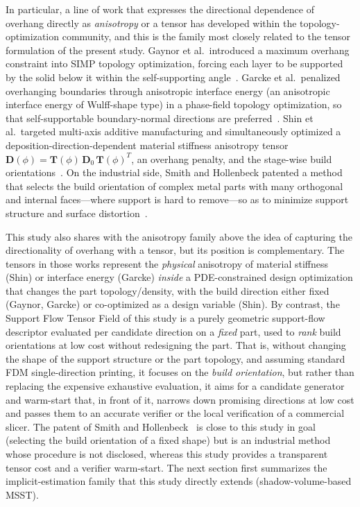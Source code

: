 \documentclass[11pt,a4paper]{article}
\begin{document}
In particular, a line of work that expresses the directional dependence of overhang directly as \emph{anisotropy} or a tensor
has developed within the topology-optimization community, and this is the family most closely related to the tensor formulation of the present study.
Gaynor et al.\ introduced a maximum overhang constraint into SIMP topology optimization, forcing each layer to be supported by the solid below it
within the self-supporting angle~\cite{gaynor2014}.
Garcke et al.\ penalized overhanging boundaries through anisotropic interface energy (an anisotropic interface energy of Wulff-shape type)
in a phase-field topology optimization, so that self-supportable boundary-normal directions are preferred~\cite{garcke2023}.
Shin et al.\ targeted multi-axis additive manufacturing and simultaneously optimized a deposition-direction-dependent material stiffness anisotropy tensor
$\mathbf{D}(\phi)=\mathbf{T}(\phi)\,\mathbf{D}_0\,\mathbf{T}(\phi)^T$, an overhang penalty, and the stage-wise build orientations~\cite{shin2025}.
On the industrial side, Smith and Hollenbeck patented a method that selects the build orientation of complex metal parts
with many orthogonal and internal faces---where support is hard to remove---so as to minimize support structure and surface distortion~\cite{smith2025patent}.

This study also shares with the anisotropy family above the idea of capturing the directionality of overhang with a tensor, but its position is complementary.
The tensors in those works represent the \emph{physical} anisotropy of material stiffness (Shin) or interface energy (Garcke)
\emph{inside} a PDE-constrained design optimization that changes the part topology/density,
with the build direction either fixed (Gaynor, Garcke) or co-optimized as a design variable (Shin).
By contrast, the Support Flow Tensor Field of this study is a purely geometric support-flow descriptor evaluated per candidate direction on a \emph{fixed} part,
used to \emph{rank} build orientations at low cost without redesigning the part.
That is, without changing the shape of the support structure or the part topology, and assuming standard FDM single-direction printing,
it focuses on the \emph{build orientation}, but rather than replacing the expensive exhaustive evaluation, it aims for a candidate generator and warm-start
that, in front of it, narrows down promising directions at low cost and passes them to an accurate verifier or the local verification of a commercial slicer.
The patent of Smith and Hollenbeck~\cite{smith2025patent} is close to this study in goal (selecting the build orientation of a fixed shape)
but is an industrial method whose procedure is not disclosed, whereas this study provides a transparent tensor cost and a verifier warm-start.
The next section first summarizes the implicit-estimation family that this study directly extends (shadow-volume-based MSST).
\end{document}
